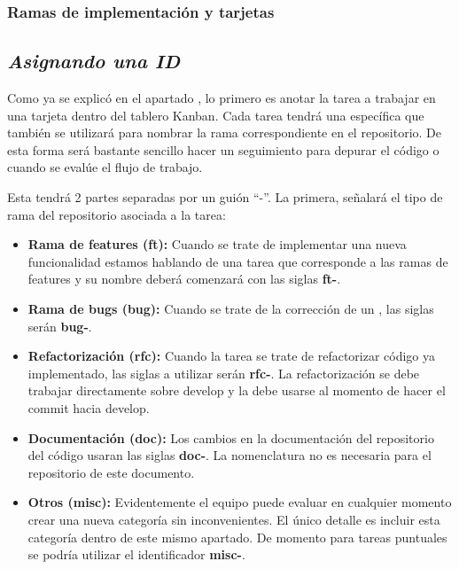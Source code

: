 \subsubsection{Ramas de implementación y tarjetas}\label{organizacion:id-ramas-tarjetas}
\subsection*{\noindent\normalfont\textit{Asignando una ID}}

Como ya se explicó en el apartado , lo primero es anotar la tarea a trabajar en una tarjeta dentro del tablero Kanban. Cada tarea tendrá una  específica que también se utilizará para nombrar la rama correspondiente en el repositorio. De esta forma será bastante sencillo hacer un seguimiento para depurar el código o cuando se evalúe el flujo de trabajo.

Esta  tendrá 2 partes separadas por un guión “-”. La primera, señalará el tipo de rama del repositorio asociada a la tarea:

\begin{itemize}
\item \textbf{Rama de features (ft):} Cuando se trate de implementar una nueva funcionalidad estamos hablando de una tarea que corresponde a las ramas de features y su nombre  deberá comenzará con las siglas \textbf{ft-}.

\item \textbf{Rama de bugs (bug):} Cuando se trate de la corrección de un , las siglas serán \textbf{bug-}.

\item \textbf{Refactorización (rfc):} Cuando la tarea se trate de refactorizar código ya implementado, las siglas a utilizar serán \textbf{rfc-}. La refactorización se debe trabajar directamente sobre develop y la  debe usarse al momento de hacer el commit hacia develop.

\item \textbf{Documentación (doc):} Los cambios en la documentación del repositorio del código usaran las siglas \textbf{doc-}. La nomenclatura no es necesaria para el repositorio de este documento.

\item \textbf{Otros (misc):} Evidentemente el equipo puede evaluar en cualquier momento crear una nueva categoría sin inconvenientes. El único detalle es incluir esta categoría dentro de este mismo apartado. De momento para tareas puntuales se podría utilizar el identificador \textbf{misc-}.
\end{itemize}

